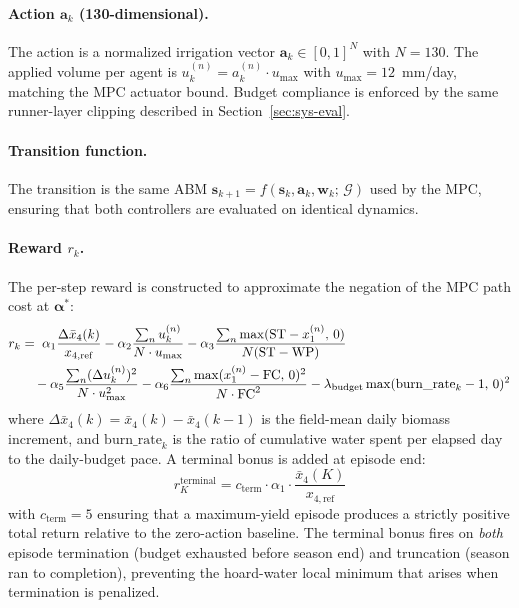 \paragraph{Action $\mathbf{a}_k$ (130-dimensional).}
The action is a normalized irrigation vector $\mathbf{a}_k \in [0,1]^N$
with $N = 130$. The applied volume per agent is
$u^{(n)}_k = a^{(n)}_k \cdot u_{\max}$ with $u_{\max} = 12$~mm/day,
matching the MPC actuator bound. Budget compliance is enforced by the
same runner-layer clipping described in Section~\ref{sec:sys-eval}.

\paragraph{Transition function.}
The transition is the same ABM
$\mathbf{s}_{k+1} = f(\mathbf{s}_k, \mathbf{a}_k, \mathbf{w}_k;\,\mathcal{G})$
used by the MPC, ensuring that both controllers are evaluated on identical
dynamics.

\paragraph{Reward $r_k$.}
The per-step reward is constructed to approximate the negation of the MPC
path cost at $\boldsymbol{\alpha}^*$:
\begin{align}
r_k &= \;\alpha_1 \frac{\Delta\bar{x}_4(k)}{x_{4,\mathrm{ref}}}
      - \alpha_2 \frac{\sum_n u^{(n)}_k}{N \cdot u_{\max}}
      - \alpha_3 \frac{\sum_n \max(\mathrm{ST} - x_1^{(n)},\,0)}{N(\mathrm{ST}-\mathrm{WP})}
      \notag\\
    &\quad
      - \alpha_5 \frac{\sum_n (\Delta u^{(n)}_k)^2}{N \cdot u_{\max}^2}
      - \alpha_6 \frac{\sum_n \max(x_1^{(n)} - \mathrm{FC},\,0)^2}{N \cdot \mathrm{FC}^2}
      - \lambda_{\mathrm{budget}} \max(\mathrm{burn\_rate}_k - 1,\,0)^2
\label{eq:sac-reward-path}
\end{align}
where $\Delta\bar{x}_4(k) = \bar{x}_4(k) - \bar{x}_4(k-1)$ is the
field-mean daily biomass increment, and $\mathrm{burn\_rate}_k$ is the ratio
of cumulative water spent per elapsed day to the daily-budget pace. A
terminal bonus is added at episode end:
\begin{equation}
r_K^{\mathrm{terminal}} = c_{\mathrm{term}} \cdot \alpha_1 \cdot
  \frac{\bar{x}_4(K)}{x_{4,\mathrm{ref}}}
\label{eq:sac-reward-terminal}
\end{equation}
with $c_{\mathrm{term}} = 5$ ensuring that a maximum-yield episode produces
a strictly positive total return relative to the zero-action baseline. The
terminal bonus fires on \emph{both} episode termination (budget exhausted
before season end) and truncation (season ran to completion), preventing
the hoard-water local minimum that arises when termination is penalized.

